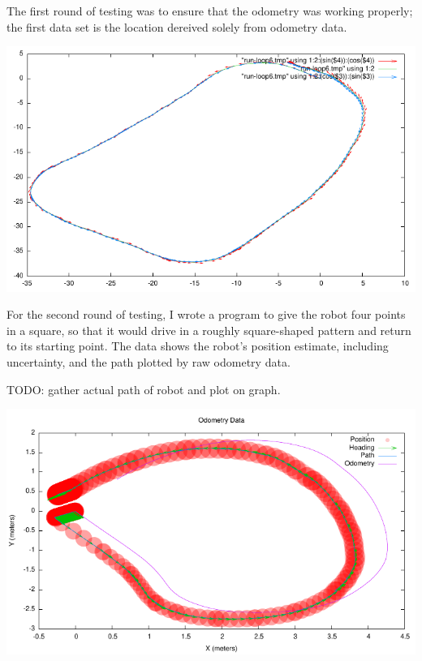 The first round of testing was to ensure that the odometry was working properly; the first data set is the location dereived solely from odometry data.

\includegraphics{run-loop6}

For the second round of testing, I wrote a program to give the robot four points in a square, so that it would drive in a roughly square-shaped pattern and return to its starting point. The data shows the robot's position estimate, including uncertainty, and the path plotted by raw odometry data.

TODO: gather actual path of robot and plot on graph.

\includegraphics{run-2011-05-30-3}
